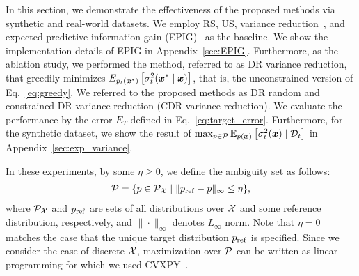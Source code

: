 In this section, we demonstrate the effectiveness of the proposed methods via synthetic and real-world datasets.
%
We employ RS, US, variance reduction~\citep{yu2006active}, and expected predictive information gain (EPIG)~\citep{bickford2023-prediction} as the baseline.
%
We show the implementation details of EPIG in Appendix~\ref{sec:EPIG}.
%
Furthermore, as the ablation study, we performed the method, referred to as DR variance reduction, that greedily minimizes $E_{p_t(\boldsymbol{x}^*)}\left[ \sigma^2_{t}(\boldsymbol{x}^* \mid \boldsymbol{x}) \right]$, that is, the unconstrained version of Eq.~\eqref{eq:greedy}.
%
We referred to the proposed methods as DR random and constrained DR variance reduction (CDR variance reduction).
%
We evaluate the performance by the error $E_T$ defined in Eq.~\eqref{eq:target_error}.
%
Furthermore, for the synthetic dataset, we show the result of $\max_{p \in {\cal P}} \mathbb{E}_{p(\boldsymbol{x})} \left[ \sigma_t^2 (\boldsymbol{x}) \mid {\cal D}_t \right]$ in Appendix~\ref{sec:exp_variance}.


In these experiments, by some $\eta \geq 0$, we define the ambiguity set as follows:
\begin{align*}
  {\cal P} = \{p \in {\cal P}_{{\cal X}} \mid \|p_{\rm ref} - p \|_{\infty} \leq \eta \},
\end{align*}
where ${\cal P}_{{\cal X}}$ and $p_{\rm ref}$ are sets of all distributions over ${\cal X}$ and some reference distribution, respectively, and $\|\cdot\|_{\infty}$ denotes $L_{\infty}$ norm.
%
Note that $\eta = 0$ matches the case that the unique target distribution $p_{\rm ref}$ is specified.
%
Since we consider the case of discrete ${\cal X}$, maximization over ${\cal P}$ can be written as linear programming for which we used CVXPY~\citep{diamond2016cvxpy,agrawal2018rewriting}.








